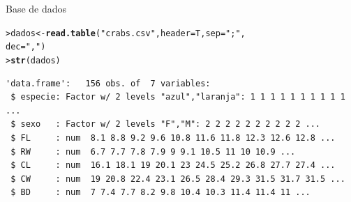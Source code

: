\documentclass[10pt]{beamer}\usepackage{graphicx, color}
\makeatletter
\newcommand{\hlfunctioncall}[1]{\textcolor[rgb]{0,0,0.545098039215686}{\textbf{#1}}}%
\newcommand{\hlstring}[1]{\textcolor[rgb]{0.282352941176471,0.23921568627451,0.545098039215686}{#1}}%
\newenvironment{kframe}{%
 \def\at@end@of@kframe{}%
 \ifinner\ifhmode%
  \def\at@end@of@kframe{\end{minipage}}%
  \begin{minipage}{\columnwidth}%
 \fi\fi%
 \def\FrameCommand##1{\hskip\@totalleftmargin \hskip-\fboxsep
 \colorbox{shadecolor}{##1}\hskip-\fboxsep
     \hskip-\linewidth \hskip-\@totalleftmargin \hskip\columnwidth}%
 \MakeFramed {\advance\hsize-\width
   \@totalleftmargin\z@ \linewidth\hsize
   \@setminipage}}%
 {\par\unskip\endMakeFramed%
 \at@end@of@kframe}
\newenvironment{knitrout}{}{} %
\makeatother
\begin{document}
\begin{frame}[fragile=singleslide]{Base de dados}
\begin{knitrout}\small
{}\color{fgcolor}\begin{kframe}
\begin{alltt}
> dados <- \hlfunctioncall{read.table}(\hlstring{"crabs.csv"}, header = T, sep = \hlstring{";"},
                      dec = \hlstring{","})
> \hlfunctioncall{str}(dados)
\end{alltt}
\begin{verbatim}
'data.frame':	156 obs. of  7 variables:
 $ especie: Factor w/ 2 levels "azul","laranja": 1 1 1 1 1 1 1 1 1 1 ...
 $ sexo   : Factor w/ 2 levels "F","M": 2 2 2 2 2 2 2 2 2 2 ...
 $ FL     : num  8.1 8.8 9.2 9.6 10.8 11.6 11.8 12.3 12.6 12.8 ...
 $ RW     : num  6.7 7.7 7.8 7.9 9 9.1 10.5 11 10 10.9 ...
 $ CL     : num  16.1 18.1 19 20.1 23 24.5 25.2 26.8 27.7 27.4 ...
 $ CW     : num  19 20.8 22.4 23.1 26.5 28.4 29.3 31.5 31.7 31.5 ...
 $ BD     : num  7 7.4 7.7 8.2 9.8 10.4 10.3 11.4 11.4 11 ...
\end{verbatim}
\end{kframe}
\end{knitrout}

\end{frame}

\end{document}
